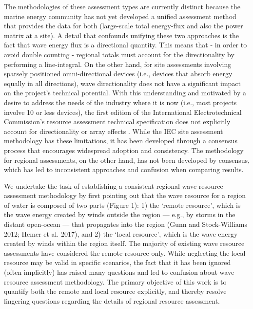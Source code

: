 \documentclass{elsarticle}
\begin{document}
The methodologies of these assessment types are currently distinct because the marine energy community has not yet developed a unified assessment method that provides the data for both (large-scale total energy-flux and also the power matrix at a site). 
A detail that confounds unifying these two approaches is the fact that wave energy flux is a directional quantity. This means that - in order to avoid double counting - regional totals must account for the directionality by performing a line-integral. On the other hand, for site assessments involving sparsely positioned omni-directional devices (i.e., devices that absorb energy equally in all directions), wave directionality does not have a significant impact on the project’s technical potential. With this understanding and motivated by a desire to address the needs of the industry where it is now (i.e., most projects involve 10 or less devices), the first edition of the International Electrotechnical Commission’s resource assessment technical specification does not explicitly account for directionality or array effects \citep[]{internationalelectrotechnicalcommissionPart101Wave2015}. While the IEC site assessment methodology has these limitations, it has been developed through a consensus process that encourages widespread adoption and consistency. The methodology for regional assessments, on the other hand, has not been developed by consensus, which has led to inconsistent approaches and confusion when comparing results.

We undertake the task of establishing a consistent regional wave resource assessment methodology by first pointing out that the wave resource for a region of water is composed of two parts (Figure 1): 1) the ‘remote resource’, which is the wave energy created by winds outside the region — e.g., by storms in the distant open-ocean — that propagates into the region (Gunn and Stock-Williams 2012; Hemer et al. 2017), and 2) the ‘local resource’, which is the wave energy created by winds within the region itself. The majority of existing wave resource assessments have considered the remote resource only. While neglecting the local resource may be valid in specific scenarios, the fact that it has been ignored (often implicitly) has raised many questions and led to confusion about wave resource assessment methodology. The primary objective of this work is to quantify both the remote and local resource explicitly, and thereby resolve lingering questions regarding the details of regional resource assessment.
\end{document}
